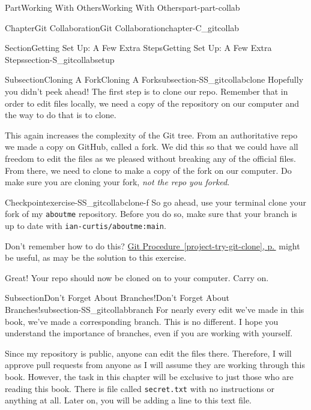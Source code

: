 \documentclass[twoside,10pt,]{book}
\newcommand{\xreffont}{\relax}
\newcommand{\mono}[1]{\texttt{#1}}
\begin{document}
\begin{partptx}{Part}{Working With Others}{}{Working With Others}{}{}{part-part-collab}
\begin{chapterptx}{Chapter}{Git Collaboration}{}{Git Collaboration}{}{}{chapter-C_gitcollab}
\begin{sectionptx}{Section}{Getting Set Up: A Few Extra Steps}{}{Getting Set Up: A Few Extra Steps}{}{}{section-S_gitcollabsetup}
\begin{introduction}{}
\end{introduction}%
%
%
\typeout{************************************************}
\typeout{************************************************}
%
\begin{subsectionptx}{Subsection}{Cloning A Fork}{}{Cloning A Fork}{}{}{subsection-SS_gitcollabclone}
%
%
Hopefully you didn't peek ahead! The first step is to clone our repo. Remember that in order to edit files locally, we need a copy of the repository on our computer and the way to do that is to clone.%
\par
This again increases the complexity of the Git tree. From an authoritative repo we made a copy on GitHub, called a fork. We did this so that we could have all freedom to edit the files as we pleased without breaking any of the official files. From there, we need to clone to make a copy of the fork on our computer. Do make sure you are cloning your fork, \emph{not the repo you forked}.%
\begin{inlineexercise}{Checkpoint}{}{exercise-SS_gitcollabclone-f}%
So go ahead, use your terminal clone your fork of my \mono{aboutme} repository. Before you do so, make sure that your branch is up to date with \mono{ian-curtis/aboutme:main}.%
\par
Don't remember how to do this? \hyperref[project-try-git-clone]{Git Procedure~{\xreffont\ref{project-try-git-clone}}, p.\,\pageref{project-try-git-clone}} might be useful, as may be the solution to this exercise.%
\end{inlineexercise}%
Great! Your repo should now be cloned on to your computer. Carry on.%
\end{subsectionptx}
%
%
\typeout{************************************************}
\typeout{************************************************}
%
\begin{subsectionptx}{Subsection}{Don't Forget About Branches!}{}{Don't Forget About Branches!}{}{}{subsection-SS_gitcollabbranch}
%
%
For nearly every edit we've made in this book, we've made a corresponding branch. This is no different. I hope you understand the importance of branches, even if you are working with yourself.%
\par
Since my repository is public, anyone can edit the files there. Therefore, I will approve pull requests from anyone as I will assume they are working through this book. However, the task in this chapter will be exclusive to just those who are reading this book. There is file called \mono{secret.txt} with no instructions or anything at all. Later on, you will be adding a line to this text file.%

\end{subsectionptx}
\end{sectionptx}
\end{chapterptx}
\end{partptx}
\end{document}
